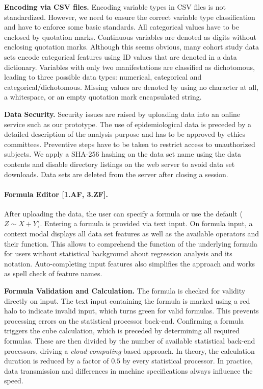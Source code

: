 \documentclass[journal]{style/vgtc} 			          %
\begin{document}
\textbf{Encoding via CSV files.}
Encoding variable types in CSV files is not standardized.
However, we need to ensure the correct variable type classification and have to enforce some basic standards.
All categorical values have to be enclosed by quotation marks.
Continuous variables are denoted as digits without enclosing quotation marks.
Although this seems obvious, many cohort study data sets encode categorical features using ID values that are denoted in a data dictionary.
Variables with only two manifestations are classified as dichotomous, leading to three possible data types: numerical, categorical and categorical/dichotomous.
Missing values are denoted by using no character at all, a whitespace, or an empty quotation mark encapsulated string.

\textbf{Data Security.}
Security issues are raised by uploading data into an online service such as our prototype.
The use of epidemiological data is preceded by a detailed description of the analysis purpose and has to be approved by ethics committees.
Preventive steps have to be taken to restrict access to unauthorized subjects.
We apply a SHA-256 hashing on the data set name using the data contents and disable directory listings on the web server to avoid data set downloads.
Data sets are deleted from the server after closing a session.

\paragraph{Formula Editor [1.AF, 3.ZF].}
After uploading the data, the user can specify a formula or use the default ($Z \sim X + Y$).
Entering a formula is provided via text input.
On formula input, a context modal displays all data set features as well as the available operators and their function.
This allows to comprehend the function of the underlying formula for users without statistical background about regression analysis and its notation.
Auto-completing input features also simplifies the approach and works as spell check of feature names.

\textbf{Formula Validation and Calculation.} The formula is checked for validity directly on input.
The text input containing the formula is marked using a red halo to indicate invalid input, which turns green for valid formulas.
This prevents processing errors on the statistical processor back-end.
Confirming a formula triggers the cube calculation, which is preceded by determining all required formulas.
These are then divided by the number of available statistical back-end processors, driving a \emph{cloud-computing}-based approach.
In theory, the calculation duration is reduced by a factor of $0.5$ by every statistical processor.
In practice, data transmission and differences in machine specifications always influence the speed.
\end{document}
